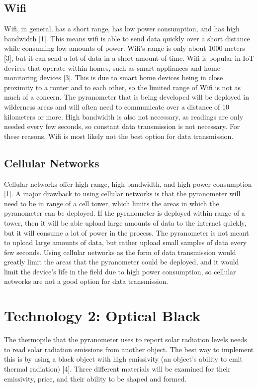 \documentclass[10pt,draftclsnofoot,onecolumn,letterpaper]{article}
\begin{document}
\subsection{Wifi}
Wifi, in general, has a short range, has low power consumption, and has high bandwidth [1]. This means wifi is able to send data quickly over a short distance while consuming low amounts of power. Wifi's range is only about 1000 meters [3], but it can send a lot of data in a short amount of time. Wifi is popular in IoT devices that operate within homes, such as smart appliances and home monitoring devices [3]. This is due to smart home devices being in close proximity to a router and to each other, so the limited range of Wifi is not as much of a concern. The pyranometer that is being developed will be deployed in wilderness areas and will often need to communicate over a distance of 10 kilometers or more. High bandwidth is also not necessary, as readings are only needed every few seconds, so constant data transmission is not necessary. For these reasons, Wifi is most likely not the best option for data transmission.

\subsection{Cellular Networks}
Cellular networks offer high range, high bandwidth, and high power consumption [1]. A major drawback to using cellular networks is that the pyranometer will need to be in range of a cell tower, which limits the areas in which the pyranometer can be deployed. If the pyranometer is deployed within range of a tower, then it will be able upload large amounts of data to the internet quickly, but it will consume a lot of power in the process. The pyranometer is not meant to upload large amounts of data, but rather upload small samples of data every few seconds. Using cellular networks as the form of data transmission would greatly limit the areas that the pyranometer could be deployed, and it would limit the device's life in the field due to high power consumption, so cellular networks are not a good option for data transmission.

\section{Technology 2: Optical Black}
The thermopile that the pyranometer uses to report solar radiation levels needs to read solar radiation emissions from another object. The best way to implement this is by using a black object with high emissivity (an object's ability to emit thermal radiation) [4]. Three different materials will be examined for their emissivity, price, and their ability to be shaped and formed.
\end{document}
